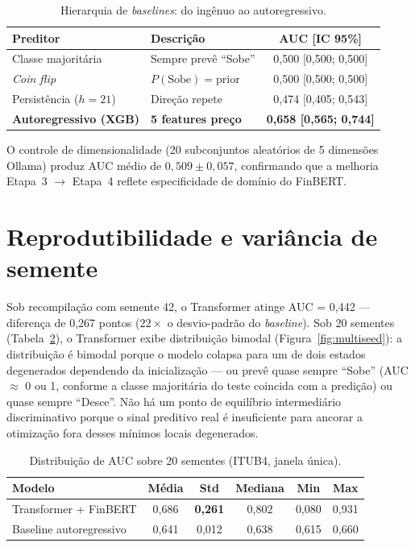 \begin{table}[htb]
\centering
\caption{Hierarquia de \textit{baselines}: do ingênuo ao autoregressivo.}\label{tab:naive}
\begin{tabular}{llc}
\toprule
\textbf{Preditor} & \textbf{Descrição} & \textbf{AUC [IC 95\%]} \\
\midrule
Classe majoritária     & Sempre prevê ``Sobe''           & 0,500 [0,500; 0,500] \\
\textit{Coin flip}     & $P(\text{Sobe}) = \text{prior}$ & 0,500 [0,500; 0,500] \\
Persistência ($h=21$)  & Direção repete                  & 0,474 [0,405; 0,543] \\
\textbf{Autoregressivo (XGB)} & \textbf{5 features preço} & \textbf{0,658 [0,565; 0,744]} \\
\bottomrule
\end{tabular}
\end{table}

O controle de dimensionalidade (20 subconjuntos aleatórios de 5 dimensões Ollama) produz AUC médio de $0{,}509 \pm 0{,}057$, confirmando que a melhoria Etapa~3 $\to$ Etapa~4 reflete especificidade de domínio do FinBERT.

\section{Reprodutibilidade e variância de semente}

Sob recompilação com semente 42, o Transformer atinge AUC = 0,442 --- diferença de 0,267 pontos ($22\times$ o desvio-padrão do \textit{baseline}). Sob 20 sementes (Tabela~\ref{tab:multiseed}), o Transformer exibe distribuição bimodal (Figura~\ref{fig:multiseed}): a distribuição é bimodal porque o modelo colapsa para um de dois estados degenerados dependendo da inicialização --- ou prevê quase sempre ``Sobe'' (AUC $\approx$ 0 ou 1, conforme a classe majoritária do teste coincida com a predição) ou quase sempre ``Desce''. Não há um ponto de equilíbrio intermediário discriminativo porque o sinal preditivo real é insuficiente para ancorar a otimização fora desses mínimos locais degenerados.

\begin{table}[htb]
\centering
\caption{Distribuição de AUC sobre 20 sementes (ITUB4, janela única).}\label{tab:multiseed}
\begin{tabular}{lccccc}
\toprule
\textbf{Modelo} & \textbf{Média} & \textbf{Std} & \textbf{Mediana} & \textbf{Min} & \textbf{Max} \\
\midrule
Transformer + FinBERT       & 0,686 & \textbf{0,261} & 0,802 & 0,080 & 0,931 \\
Baseline autoregressivo     & 0,641 & 0,012           & 0,638 & 0,615 & 0,660 \\
\bottomrule
\end{tabular}
\end{table}

